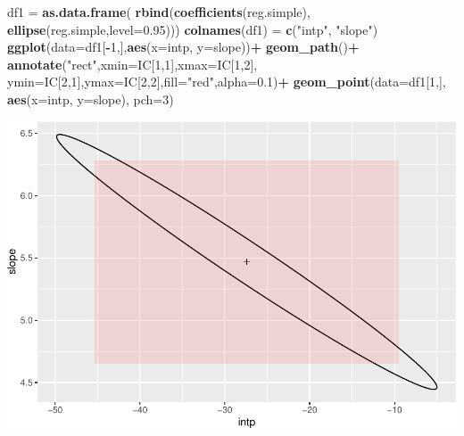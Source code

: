 \documentclass[
]{article}
\newenvironment{Shaded}{\begin{snugshade}}{\end{snugshade}}
\newcommand{\AttributeTok}[1]{\textcolor[rgb]{0.13,0.29,0.53}{#1}}
\newcommand{\DecValTok}[1]{\textcolor[rgb]{0.00,0.00,0.81}{#1}}
\newcommand{\FloatTok}[1]{\textcolor[rgb]{0.00,0.00,0.81}{#1}}
\newcommand{\FunctionTok}[1]{\textcolor[rgb]{0.13,0.29,0.53}{\textbf{#1}}}
\newcommand{\NormalTok}[1]{#1}
\newcommand{\OtherTok}[1]{\textcolor[rgb]{0.56,0.35,0.01}{#1}}
\newcommand{\SpecialCharTok}[1]{\textcolor[rgb]{0.81,0.36,0.00}{\textbf{#1}}}
\newcommand{\StringTok}[1]{\textcolor[rgb]{0.31,0.60,0.02}{#1}}
\begin{document}
\begin{Shaded}
\begin{Highlighting}[]
\NormalTok{df1 }\OtherTok{=} \FunctionTok{as.data.frame}\NormalTok{(}
             \FunctionTok{rbind}\NormalTok{(}\FunctionTok{coefficients}\NormalTok{(reg.simple),}
             \FunctionTok{ellipse}\NormalTok{(reg.simple,}\AttributeTok{level=}\FloatTok{0.95}\NormalTok{)))}
\FunctionTok{colnames}\NormalTok{(df1) }\OtherTok{=} \FunctionTok{c}\NormalTok{(}\StringTok{"intp"}\NormalTok{, }\StringTok{"slope"}\NormalTok{)}
\FunctionTok{ggplot}\NormalTok{(}\AttributeTok{data=}\NormalTok{df1[}\SpecialCharTok{{-}}\DecValTok{1}\NormalTok{,],}\FunctionTok{aes}\NormalTok{(}\AttributeTok{x=}\NormalTok{intp, }\AttributeTok{y=}\NormalTok{slope))}\SpecialCharTok{+}
  \FunctionTok{geom\_path}\NormalTok{()}\SpecialCharTok{+}
  \FunctionTok{annotate}\NormalTok{(}\StringTok{"rect"}\NormalTok{,}\AttributeTok{xmin=}\NormalTok{IC[}\DecValTok{1}\NormalTok{,}\DecValTok{1}\NormalTok{],}\AttributeTok{xmax=}\NormalTok{IC[}\DecValTok{1}\NormalTok{,}\DecValTok{2}\NormalTok{],}
  \AttributeTok{ymin=}\NormalTok{IC[}\DecValTok{2}\NormalTok{,}\DecValTok{1}\NormalTok{],}\AttributeTok{ymax=}\NormalTok{IC[}\DecValTok{2}\NormalTok{,}\DecValTok{2}\NormalTok{],}\AttributeTok{fill=}\StringTok{"red"}\NormalTok{,}\AttributeTok{alpha=}\FloatTok{0.1}\NormalTok{)}\SpecialCharTok{+}
  \FunctionTok{geom\_point}\NormalTok{(}\AttributeTok{data=}\NormalTok{df1[}\DecValTok{1}\NormalTok{,], }\FunctionTok{aes}\NormalTok{(}\AttributeTok{x=}\NormalTok{intp, }\AttributeTok{y=}\NormalTok{slope), }
               \AttributeTok{pch=}\DecValTok{3}\NormalTok{)}
\end{Highlighting}
\end{Shaded}

\includegraphics{TP-ML-Regression_files/figure-latex/unnamed-chunk-17-1.pdf}
\end{document}
